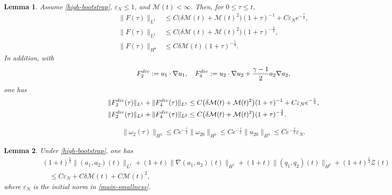 \documentclass[10pt,a4paper]{amsart}
\newtheorem{lem}{Lemma}
\begin{document}
\begin{lem}\label{lem-nonlinear-source}
Assume \eqref{high-bootstrap}, $\varepsilon_N\le1$, and
$\mathcal M(t)<\infty$. Then, for
$0\le\tau\le t$,
\begin{align}\label{source-L1}
\|F(\tau)\|_{L^1}
&\le C\big(\delta\mathcal M(t)+\mathcal M(t)^2\big)(1+\tau)^{-1}
+C\varepsilon_Ne^{-\frac{\tau}{2}},\\
\label{source-L2}
\|F(\tau)\|_{L^2}
&\le C\big(\delta\mathcal M(t)+\mathcal M(t)^2\big)(1+\tau)^{-\frac{3}{2}},\\
\label{source-H8}
\|F(\tau)\|_{H^8}
&\le C\delta\mathcal M(t)(1+\tau)^{-\frac{5}{4}}.
\end{align}
In addition, with
\[
F_2^{\rm div}:=u_1\cdot\nabla u_1,\quad
F_4^{\rm div}:=u_2\cdot\nabla u_2+\frac{\gamma-1}{2}a_2\nabla a_2,
\]
one has
\begin{align}\label{vector-source-L1L2}
\begin{aligned}
\|F_2^{\rm div}(\tau)\|_{L^1}+\|F_4^{\rm div}(\tau)\|_{L^1} &\le C\big(\delta\mathcal M(t)+\mathcal M(t)^2\big)(1+\tau)^{-1} +C\varepsilon_Ne^{-\frac{\tau}{2}},\\
\|F_2^{\rm div}(\tau)\|_{L^2}+\|F_4^{\rm div}(\tau)\|_{L^2} &\le C\big(\delta\mathcal M(t)+\mathcal M(t)^2\big)(1+\tau)^{-\frac{3}{2}}.
\end{aligned}
\end{align}
\end{lem}

\begin{align}\label{omega2-decay}
\|\omega_2(\tau)\|_{H^2}
\le Ce^{-\frac{\tau}{2}}\|\omega_{20}\|_{H^2}
\le  Ce^{-\frac{\tau}{2}}\|u_{20}\|_{H^3}\le Ce^{-\frac{\tau}{2}}\varepsilon_N.
\end{align}

\begin{lem}\label{lem-nonlinear-decay}
Under \eqref{high-bootstrap}, one has
\begin{align*}%
&(1+t)^{\frac{1}{2}}\|(a_1,a_2)(t)\|_{L^2} +(1+t)\|\nabla(a_1,a_2)(t)\|_{H^1} +(1+t)\|(q_1,q_2)(t)\|_{H^2} +(1+t)^{\frac{5}{4}}\mathcal Z(t)\\
&\quad \le C\varepsilon_N+C\delta\mathcal M(t)+C\mathcal M(t)^2,
\end{align*}
where $\varepsilon_N$ is the initial norm in \eqref{main-smallness}.
\end{lem}
\end{document}
